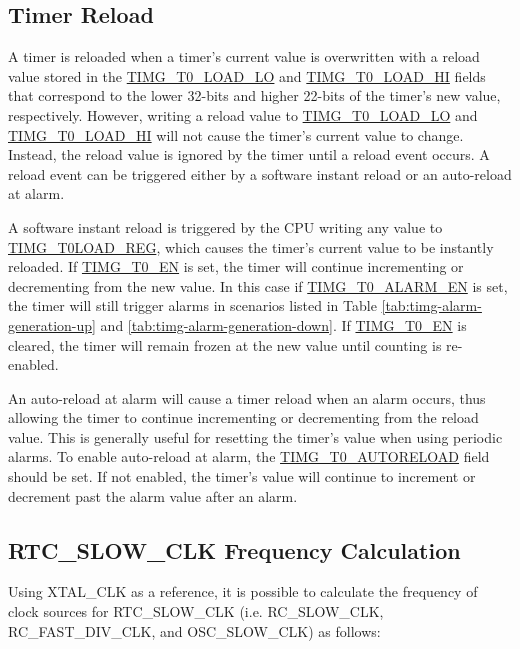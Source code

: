 \documentclass[main\_\_EN.tex]{subfiles}
\begin{document}
\subsection{Timer Reload} \label{sec:timg-func-descr-reload}
A timer is reloaded when a timer's current value is overwritten with a reload value stored in the \hyperref[fielddesc:TIMGTXLOADLO]{TIMG\_T0\_LOAD\_LO} and \hyperref[fielddesc:TIMGTXLOADHI]{TIMG\_T0\_LOAD\_HI} fields that correspond to the lower 32-bits and higher 22-bits of the timer's new value, respectively. However, writing a reload value to \hyperref[fielddesc:TIMGTXLOADLO]{TIMG\_T0\_LOAD\_LO} and \hyperref[fielddesc:TIMGTXLOADHI]{TIMG\_T0\_LOAD\_HI} will not cause the timer's current value to change. Instead, the reload value is ignored by the timer until a reload event occurs. A reload event can be triggered either by a software instant reload or an auto-reload at alarm.

A software instant reload is triggered by the CPU writing any value to \hyperref[regdesc:TIMGTXLOADREG]{TIMG\_T0LOAD\_REG}, which causes the timer's current value to be instantly reloaded. If \hyperref[fielddesc:TIMGTXEN]{TIMG\_T0\_EN} is set, the timer will continue incrementing or decrementing from the new value. In this case if \hyperref[fielddesc:TIMGTXALARMEN]{TIMG\_T0\_ALARM\_EN} is set, the timer will still trigger alarms in scenarios listed in Table \ref{tab:timg-alarm-generation-up} and \ref{tab:timg-alarm-generation-down}. If \hyperref[fielddesc:TIMGTXEN]{TIMG\_T0\_EN} is cleared, the timer will remain frozen at the new value until counting is re-enabled. 

An auto-reload at alarm will cause a timer reload when an alarm occurs, thus allowing the timer to continue incrementing or decrementing from the reload value. This is generally useful for resetting the timer's value when using periodic alarms. To enable auto-reload at alarm, the \hyperref[fielddesc:TIMGTXAUTORELOAD]{TIMG\_T0\_AUTORELOAD} field should be set. If not enabled, the timer's value will continue to increment or decrement past the alarm value after an alarm.

\subsection{RTC\_SLOW\_CLK Frequency Calculation}\label{sec:rtc-calibration-desc}

Using XTAL\_CLK as a reference, it is possible to calculate the frequency of clock sources for RTC\_SLOW\_CLK (i.e. RC\_SLOW\_CLK, RC\_FAST\_DIV\_CLK, and OSC\_SLOW\_CLK) as follows:
\end{document}
